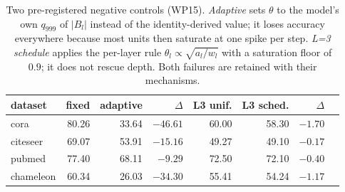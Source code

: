 \begin{table}[t]
\centering
\footnotesize
\caption{Two pre-registered negative controls (WP15). \emph{Adaptive} sets $\theta$ to
the model's own $q_{999}$ of $|B_l|$ instead of the identity-derived value; it loses
accuracy everywhere because most units then saturate at one spike per step.
\emph{L=3 schedule} applies the per-layer rule $\theta_l\propto\sqrt{a_l/w_l}$ with a
saturation floor of $0.9$; it does not rescue depth. Both failures are retained with their
mechanisms.}\label{tab:negative}
\begin{tabular}{lrrrrrrr}
\toprule
dataset & fixed & adaptive & $\Delta$ & L3 unif. & L3 sched. & $\Delta$ \\
\midrule
cora & 80.26 & 33.64 & $-46.61$ & 60.00 & 58.30 & $-1.70$ \\
citeseer & 69.07 & 53.91 & $-15.16$ & 49.27 & 49.10 & $-0.17$ \\
pubmed & 77.40 & 68.11 & $-9.29$ & 72.50 & 72.10 & $-0.40$ \\
chameleon & 60.34 & 26.03 & $-34.30$ & 55.41 & 54.24 & $-1.17$ \\
\bottomrule
\end{tabular}
\end{table}
